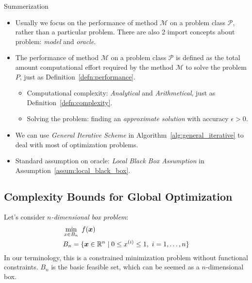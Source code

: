 \begin{boxnote}{Summerization}
    \begin{itemize}
        \item Usually we focus on the performance of method \(\mathscr{M}\) on a problem class \(\mathscr{P}\), rather than a particular problem. There are also 2 import concepts about problem: \emph{model} and \emph{oracle}.
        \item The performance of method \(\mathscr{M}\) on a problem class \(\mathscr{P}\) is defined as the total amount computational effort required by the method \(\mathscr{M}\) to solve the problem \(P\), just as Definition~\ref{defn:performance}.
              \begin{itemize}
                \item Computational complexity: \emph{Analytical} and \emph{Arithmetical}, just as Definition~\ref{defn:complexity}.
                \item Solving the problem: finding an \emph{approximate solution} with accuracy \(\epsilon > 0\).
              \end{itemize}
        \item We can use \emph{General Iterative Scheme} in Algorithm~\ref{alg:general_iterative} to deal with most of optimization problems.
        \item Standard assumption on oracle: \emph{Local Black Box Assumption} in Assumption~\ref{assum:local_black_box}.
    \end{itemize}
\end{boxnote}

\subsection{Complexity Bounds for Global Optimization}\label{subsec:Complexity_Bounds_for_Global_Optimization}

Let's consider \emph{\(n\)-dimensional box problem}:
\begin{equation}\label{eq:n_dimensional_box}
    \begin{aligned}
        & \min_{x \in B_n} ~ f(\boldsymbol{x}) \\
        & B_n = \{ \boldsymbol{x} \in \mathbb{R}^n \mid 0 \le {x}^{(i)} \le 1, ~ i = 1, \dots, n \}
    \end{aligned}
\end{equation}
In our terminology, this is a constrained minimization problem without functional constraints. \(B_n\) is the basic feasible set, which can be seemed as a \(n\)-dimensional box.


